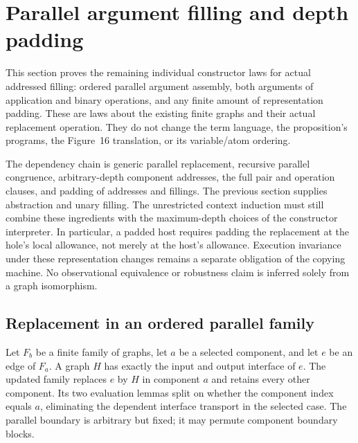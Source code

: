 \clearpage
\section{Parallel argument filling and depth padding}
\label{sec:copying-parallel-padding}
This section proves the remaining individual constructor laws for actual
addressed filling: ordered parallel argument assembly, both arguments of
application and binary operations, and any finite amount of representation
padding. These are laws about the existing finite graphs and their actual
replacement operation. They do not change the term language, the proposition's
programs, the Figure~16 translation, or its variable/atom ordering.

The dependency chain is generic parallel replacement, recursive parallel
congruence, arbitrary-depth component addresses, the full pair and operation
clauses, and padding of addresses and fillings. The previous section supplies
abstraction and unary filling. The unrestricted context induction must still
combine these ingredients with the maximum-depth choices of the constructor
interpreter. In particular, a padded host requires padding the replacement at
the hole's local allowance, not merely at the host's allowance. Execution
invariance under these representation changes remains a separate obligation
of the copying machine. No observational equivalence or robustness claim is
inferred solely from a graph isomorphism.

\subsection{Replacement in an ordered parallel family}

Let $F_b$ be a finite family of graphs, let $a$ be a selected component,
and let $e$ be an edge of $F_a$. A graph $H$ has exactly the input and output
interface of $e$. The updated family replaces $e$ by $H$ in component $a$
and retains every other component. Its two evaluation lemmas split on whether
the component index equals $a$, eliminating the dependent interface transport
in the selected case. The parallel boundary is arbitrary but fixed; it may
permute component boundary blocks.





